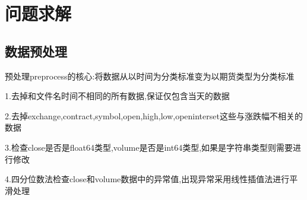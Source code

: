 \documentclass[a4paper,12pt]{ctexart}
\begin{document}
\section{问题求解}

\subsection{数据预处理}
预处理preprocess的核心:将数据从以时间为分类标准变为以期货类型为分类标准

1.去掉和文件名时间不相同的所有数据,保证仅包含当天的数据

2.去掉exchange,contract,symbol,open,high,low,openinterset这些与涨跌幅不相关的数据

3.检查close是否是float64类型,volume是否是int64类型,如果是字符串类型则需要进行修改

4.四分位数法检查close和volume数据中的异常值,出现异常采用线性插值法进行平滑处理
\end{document}
